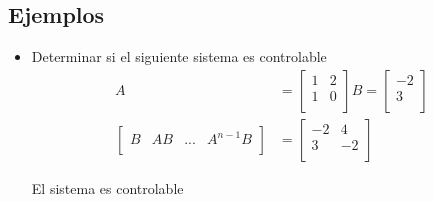 \documentclass[12pt]{article}
\begin{document}
\subsection{Ejemplos}
\begin{itemize}
    \item Determinar si el siguiente sistema es controlable
    \begin{equation}
        \begin{split}
            A&=
            \begin{bmatrix}
                1 & 2 \\
                1 & 0 \\
            \end{bmatrix}
            B=
            \begin{bmatrix}
                -2 \\
                3 \\
            \end{bmatrix}\\
            \begin{bmatrix}
                B & AB & ... & A^{n-1}B \\
            \end{bmatrix}&=
            \begin{bmatrix}
                -2 & 4 \\
                3 & -2 \\
            \end{bmatrix}
        \end{split}
        \label{eq:controla1}
    \end{equation}

    El sistema es controlable


\end{itemize}
\end{document}
